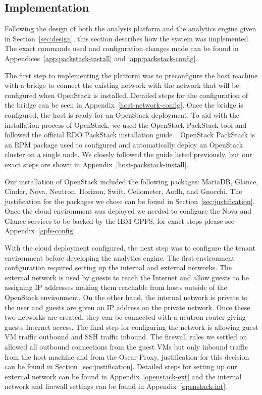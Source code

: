 \subsection{Implementation}
\label{sec:implementation}

Following the design of both the analysis platform and the analytics engine
given in Section~\ref{sec:design}, this section describes how the system
was implemented. The exact commands used and configuration changes made
can be found in Appendices~\ref{app:packstack-install} and
\ref{app:packstack-config}.

The first step to implementing the platform was to preconfigure the host
machine with a bridge to connect the existing network with the network
that will be configured when OpenStack is installed. Detailed steps for
the configuration of the bridge can be seen in
Appendix~\ref{host-network-config}. Once the bridge is configured, the
host is ready for an OpenStack deployment. To aid with the installation
process of OpenStack, we used the OpenStack PackStack tool and followed
the official RDO PackStack installation guide~\cite{PackStacksetup}.
OpenStack PackStack is an RPM package used to configured and
automatically deploy an OpenStack cluster on a single node. We closely
followed the guide listed previously, but our exact steps are shown in
Appendix~\ref{host-packstack-install}.

Our installation of OpenStack included the following packages: MariaDB,
Glance, Cinder, Nova, Neutron, Horizon, Swift, Ceilometer, Aodh, and 
Gnocchi. The justification for the packages we chose can be found in
Section~\ref{sec:justification}. Once the cloud environment was deployed
we needed to configure the Nova and Glance services to be backed by the
IBM GPFS, for exact steps please see Appendix~\ref{gpfs-config}.

With the cloud deployment configured, the next step was to configure
the tenant environment before developing the analytics engine. The first
environment configuration required setting up the internal and external
networks. The external network is used by guests to reach the Internet
and allow guests to be assigning IP addresses making them reachable from
hosts outside of the OpenStack environment. On the other hand, the
internal network is private to the user and guests are given an IP
address on the private network. Once these two networks are created,
they can be connected with a neutron router giving guests Internet
access. The final step for configuring the network is allowing guest VM
traffic outbound and SSH traffic inbound. The firewall rules we settled
on allowed all outbound connections from the guest VMs but only inbound
traffic from the host machine and from the Oscar Proxy, justification
for this decision can be found in Section~\ref{sec:justification}.
Detailed steps for setting up our external network can be found in
Appendix~\ref{openstack-ext} and the internal network and firewall
settings can be found in Appendix~\ref{openstack-int}.

